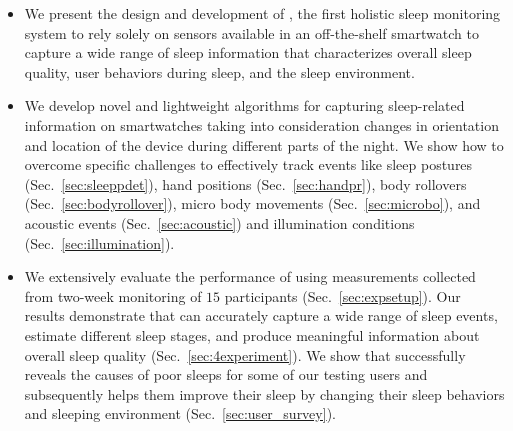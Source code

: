\begin{itemize}
	\item We present the design and development of {\systemname}, the first holistic sleep monitoring system to rely solely on sensors
available in an off-the-shelf smartwatch to capture a wide range of sleep information that characterizes overall sleep quality, user
behaviors during sleep, and the sleep environment.
	
\item We develop novel and lightweight algorithms for capturing sleep-related information on smartwatches taking into consideration changes
in orientation and location of the device during different parts of the night. We show how to overcome specific challenges to effectively
track events like sleep postures (Sec.~\ref{sec:sleeppdet}), hand positions (Sec.~\ref{sec:handpr}), body rollovers
(Sec.~\ref{sec:bodyrollover}), micro body movements (Sec.~\ref{sec:microbo}), and acoustic events (Sec.~\ref{sec:acoustic}) and
illumination conditions (Sec.~\ref{sec:illumination}).
	

    \item We extensively evaluate the performance of {\systemname} using measurements collected from two-week monitoring of $15$
    participants (Sec.~\ref{sec:expsetup}). Our results demonstrate that {\systemname} can accurately capture a wide range of sleep events,
    estimate different sleep stages, and produce meaningful information about overall sleep quality (Sec.~\ref{sec:4experiment}).  We show
    that {\systemname} successfully reveals the causes of poor sleeps for some of our testing users and subsequently helps them improve
    their sleep by changing their sleep behaviors and sleeping environment  (Sec.~\ref{sec:user_survey}).
\end{itemize}
